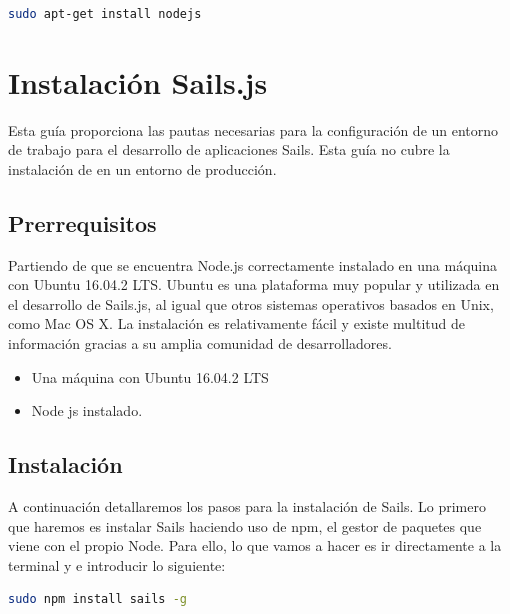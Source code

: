 \begin{appendix}
\begin{lstlisting}[language=bash]
sudo apt-get install nodejs
\end{lstlisting}




\section{Instalación Sails.js}

Esta guía proporciona las pautas necesarias para la configuración de un entorno de trabajo para el desarrollo de aplicaciones Sails. Esta guía no cubre la instalación de en un entorno de producción.\\

\subsection{Prerrequisitos}

Partiendo de que se encuentra Node.js correctamente instalado en una máquina con Ubuntu 16.04.2 LTS. Ubuntu es una plataforma muy popular y utilizada en el desarrollo de Sails.js, al igual que otros sistemas operativos basados en Unix, como Mac OS X. La instalación es relativamente fácil y existe multitud de información gracias a su amplia comunidad de desarrolladores.\\

\begin{itemize}

\item{Una máquina con Ubuntu 16.04.2 LTS }
\item{Node js instalado.}


\end{itemize}

\subsection{Instalación}

A continuación detallaremos los pasos para la instalación de Sails. Lo primero que haremos es instalar Sails haciendo uso de npm, el gestor de paquetes que viene con el propio Node. Para ello, lo que vamos a hacer es ir directamente a la terminal y e introducir lo siguiente:\\

\begin{lstlisting}[language=bash]
sudo npm install sails -g
\end{lstlisting}


\end{appendix}
